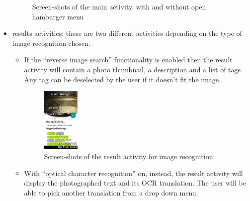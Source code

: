 \begin{itemize}
\begin{figure}[h]
        \caption{Screen-shots of the main activity, with and without open 
                 hamburger menu}
        \label{fig:splash}
    \end{figure}
  \item results activities: these are two different activities depending on
    the type of image recognition chosen.
    \begin{itemize}
     \item If the ``reverse image search'' functionality is enabled then the
result activity will contain a photo thumbnail, a description and a list of
tags. Any tag can be deselected by the user if it doesn't fit the image.
    \begin{figure}[h]
        \centering
        \includegraphics[width=0.18\textwidth]{../img/image_result_activity}
        \caption{Screen-shots of the result activity for image recognition}
        \label{fig:splash}
    \end{figure}
     \item With ``optical character recognition'' on, instead, the result
activity will display the photographed text and its OCR translation. The user
will be able to pick another translation from a drop down menu.
    \end{itemize}
\end{itemize}
